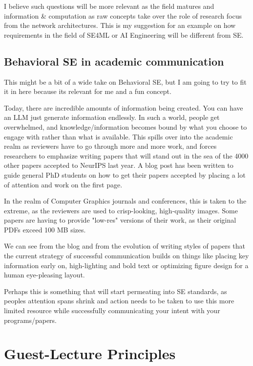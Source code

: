 \documentclass[a4paper, 11pt]{article} %
\begin{document}
I believe such questions will be more relevant as the field matures and information \& computation as raw concepts take over the role of research focus from the network architectures.
This is my suggestion for an example on how requirements in the field of SE4ML or AI Engineering will be different from SE.

\subsection{Behavioral SE in academic communication}
This might be a bit of a wide take on Behavioral SE, but I am going to try to fit it in here because its relevant for me and a fun concept.

Today, there are incredible amounts of information being created. You can have an LLM just generate information endlessly. In such a world, people get overwhelmed,
and knowledge/information becomes bound by what you choose to engage with rather than what is available. This spills over into the academic realm as reviewers have to go through more and more work, and forces researchers to 
emphasize writing papers that will stand out in the sea of the 4000 other papers accepted to NeurIPS last year. A blog post has been written to guide general PhD students
on how to get their papers accepted \cite{paperblog} by placing a lot of attention and work on the first page.

In the realm of Computer Graphics journals and conferences, this is taken to the extreme, as the reviewers are used to crisp-looking, high-quality images.
Some papers are having to provide "low-res" versions of their work, as their original PDFs exceed 100 MB sizes.

We can see from the blog and from the evolution of writing styles of papers that the current strategy of successful communication builds on things like placing key information early on,
high-lighting and bold text or optimizing figure design for a human eye-pleasing layout.

Perhaps this is something that will start permeating into SE standards, as peoples attention spans shrink and action needs to be taken to use this more limited resource while 
successfully communicating your intent with your programs/papers.

\section{Guest-Lecture Principles}
\end{document}
